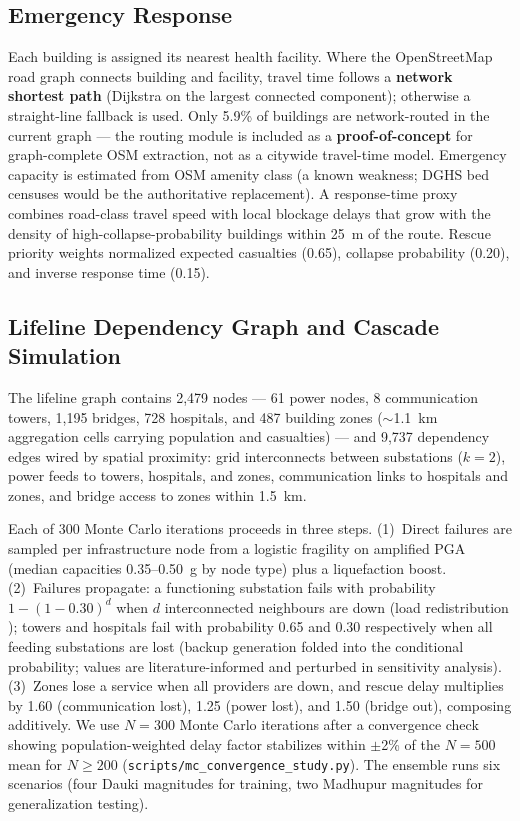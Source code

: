 \documentclass[a4paper,fleqn]{cas-sc}
\begin{document}
\subsection{Emergency Response}
\label{sec:response}
Each building is assigned its nearest health facility. Where the OpenStreetMap
road graph connects building and facility, travel time follows a
\textbf{network shortest path} (Dijkstra on the largest connected component);
otherwise a straight-line fallback is used. Only 5.9\% of buildings are
network-routed in the current graph --- the routing module is included as a
\textbf{proof-of-concept} for graph-complete OSM extraction, not as a
citywide travel-time model. Emergency capacity is estimated from OSM amenity
class (a known weakness; DGHS bed censuses would be the authoritative
replacement). A response-time proxy combines road-class travel speed
with local blockage delays that grow with the density of high-collapse-probability
buildings within 25~m of the route. Rescue priority weights normalized expected
casualties (0.65), collapse probability (0.20), and inverse response time (0.15).

\subsection{Lifeline Dependency Graph and Cascade Simulation}
\label{sec:cascade}
The lifeline graph contains 2{,}479 nodes --- 61 power nodes, 8
communication towers, 1{,}195 bridges, 728 hospitals, and 487 building
zones ($\sim$1.1~km aggregation cells carrying population and casualties)
--- and 9{,}737 dependency edges wired by spatial proximity: grid
interconnects between substations ($k=2$), power feeds to towers, hospitals,
and zones, communication links to hospitals and zones, and bridge access to
zones within 1.5~km.

Each of 300 Monte Carlo iterations proceeds in three steps. (1)~Direct
failures are sampled per infrastructure node from a logistic fragility on
amplified PGA (median capacities 0.35--0.50~g by node type) plus a
liquefaction boost. (2)~Failures propagate: a functioning substation fails
with probability $1-(1-0.30)^{d}$ when $d$ interconnected neighbours are
down (load redistribution \cite{motter2002}); towers and hospitals fail
with probability 0.65 and 0.30 respectively when all feeding substations
are lost \cite{ouyang2014} (backup generation folded into the conditional
probability; values are literature-informed and perturbed in sensitivity
analysis). (3)~Zones lose a service when all providers are down, and rescue
delay multiplies by 1.60 (communication lost), 1.25 (power lost), and 1.50
(bridge out), composing additively. We use $N = 300$ Monte Carlo iterations
after a convergence check showing population-weighted delay factor stabilizes
within $\pm$2\% of the $N = 500$ mean for $N \geq 200$
(\texttt{scripts/mc\_convergence\_study.py}). The ensemble runs six scenarios
(four Dauki magnitudes for training, two Madhupur magnitudes for
generalization testing).
\end{document}
